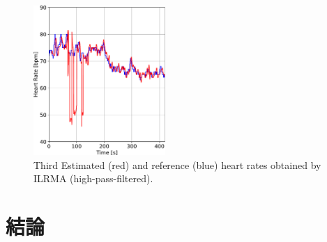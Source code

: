 \documentclass[10.5pt]{jarticle}
\begin{document}
\begin{figure}[tb]
\centering
\includegraphics[width=50mm]{hr_ILRMAtype1_64_ch3.pdf}
\vspace{-10pt} %
\caption{Third Estimated (red) and reference (blue) heart rates obtained by ILRMA (high-pass-filtered).}
\vspace{-10pt} %
\label{fig:hrilrma1}
\end{figure}

\section{結論}
\hspace{1.0em}
\end{document}
